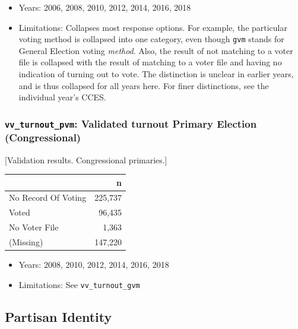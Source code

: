 \documentclass[10pt,article,oneside]{memoir}
\theoremstyle{definition}
\begin{document}
\begin{itemize}
\tightlist
\item
  Years: 2006, 2008, 2010, 2012, 2014, 2016, 2018
\item
  Limitations: Collapses most response options. For example, the
  particular voting method is collapsed into one category, even though
  \texttt{gvm} stands for General Election voting \emph{method}. Also,
  the result of not matching to a voter file is collapsed with the
  result of matching to a voter file and having no indication of turning
  out to vote. The distinction is unclear in earlier years, and is thus
  collapsed for all years here. For finer distinctions, see the
  individual year's CCES.
\end{itemize}

\hypertarget{vv_turnout_pvm-validated-turnout-primary-election-congressional}{%
\subsubsection{\texorpdfstring{\texttt{vv\_turnout\_pvm}: Validated
turnout Primary Election
(Congressional)}{vv\_turnout\_pvm: Validated turnout Primary Election (Congressional)}}\label{vv_turnout_pvm-validated-turnout-primary-election-congressional}}

{[}Validation results. Congressional primaries.{]}

\begin{table}[H]
\centering
\begin{tabular}{lr}
\toprule
 & n\\
\midrule
No Record Of Voting & 225,737\\
Voted & 96,435\\
No Voter File & 1,363\\
(Missing) & 147,220\\
\bottomrule
\end{tabular}
\end{table}

\begin{itemize}
\tightlist
\item
  Years: 2008, 2010, 2012, 2014, 2016, 2018
\item
  Limitations: See \texttt{vv\_turnout\_gvm}
\end{itemize}

\newpage

\hypertarget{partisan-identity}{%
\subsection{Partisan Identity}\label{partisan-identity}}
\end{document}
